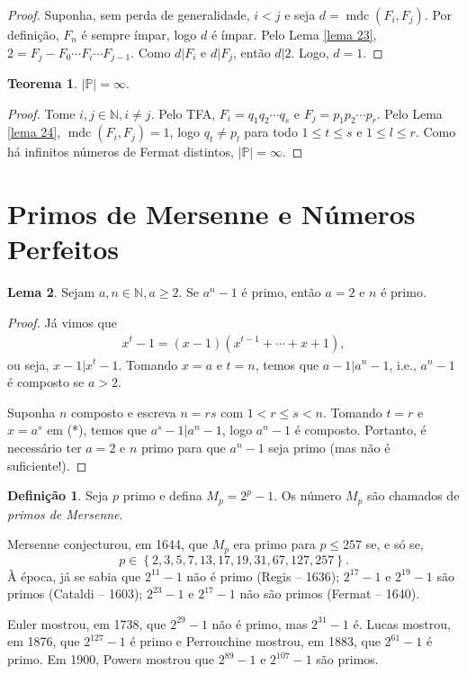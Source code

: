 \documentclass[a4paper,11pt,twoside, leqno]{article}
\DeclareMathOperator{\mdc}{mdc}
\theoremstyle{definition}
\newtheorem{theorem}{Teorema}[section]
\newtheorem*{definition}{Definição}
\newtheorem{lemma}[theorem]{Lema}
\begin{document}
\begin{proof}
	Suponha, sem perda de generalidade, $i<j$ e seja $d = \mdc(F_i, F_j)$. Por definição, $F_n$ é sempre ímpar, logo $d$ é ímpar. Pelo Lema \eqref{lema 23}, $2 = F_j - F_0\cdots F_i\cdots F_{j-1}$. Como $d|F_i$ e $d|F_j$, então $d|2$. Logo, $d = 1$.
\end{proof}
\begin{theorem}
	$|\mathbb{P}| = \infty$.
\end{theorem}
\begin{proof}
	Tome $i,j\in\mathbb{N}, i\neq j$. Pelo TFA, $F_i = q_1q_2\cdots q_s$ e $F_j = p_1p_2\cdots p_r$. Pelo Lema \eqref{lema 24}, $\mdc(F_i, F_j) = 1$, logo $q_t\neq p_l$ para todo $1\leq t\leq s$ e $1\leq l\leq r$. Como há infinitos números de Fermat distintos, $|\mathbb{P}| = \infty$.
\end{proof}
\section{Primos de Mersenne e Números Perfeitos}
\begin{lemma}
	\label{lema 25}
	Sejam $a,n\in\mathbb{N}, a\geq 2$. Se $a^n - 1$ é primo, então $a = 2$ e $n$ é primo.
\end{lemma}
\begin{proof}
	Já vimos que
	\begin{align*}
	\tag{*}
	x^t - 1 = (x - 1)(x^{t-1} + \cdots + x + 1),
	\end{align*}
	ou seja, $x-1|x^t-1$. Tomando $x = a$ e $t = n$, temos que $a-1|a^n-1$, i.e., $a^n - 1$ é composto se $a > 2$.
	
	Suponha $n$ composto e escreva $n = rs$ com $1 < r \leq s < n$. Tomando $t = r$ e $x = a^s$ em (*), temos que $a^s - 1|a^n - 1$, logo $a^n - 1$ é composto. Portanto, é necessário ter $a=2$ e $n$ primo para que $a^n - 1$ seja primo (mas não é suficiente!).
\end{proof}
\begin{definition}
	Seja $p$ primo e defina $M_p = 2^p - 1$. Os número $M_p$ são chamados de {\em primos de Mersenne}.
\end{definition}
Mersenne conjecturou, em 1644, que $M_p$ era primo para $p\leq 257$ se, e só se, $$p\in\left\{ 2, 3, 5, 7, 13, 17, 19, 31, 67, 127, 257 \right\}.$$ À época, já se sabia que $2^{11} - 1$ não é primo (Regis -- 1636); $2^{17} - 1$ e $2^{19} - 1$ são primos (Cataldi -- 1603); $2^{23} - 1$ e $2^{17} - 1$ não são primos (Fermat -- 1640). 

Euler mostrou, em 1738, que $2^{29} - 1$ não é primo, mas $2^{31} - 1$ é. Lucas mostrou, em 1876, que $2^{127} - 1$ é primo e Perrouchine mostrou, em 1883, que $2^{61} - 1$ é primo. Em 1900, Powers mostrou que $2^{89} - 1$ e $2^{107} - 1$ são primos.
\end{document}
